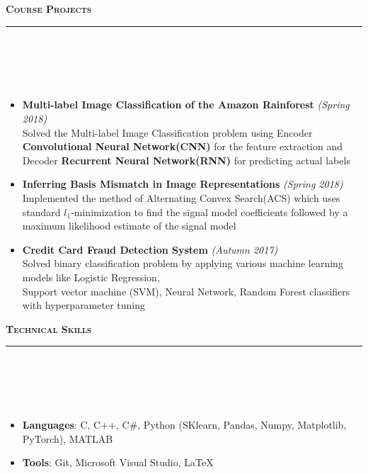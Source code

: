 \documentclass[a4paper,10pt]{article}
\newcommand{\lsep}{-0.5cm}
\newcommand{\resheading}[1]{{\small
        {
            \begin{minipage}
                {0.992\textwidth}\textbf{{\textsc{#1 \vphantom{p\^{E}} }}}
                \\[-0.3cm]
                \hrule
            \end{minipage}
            \\[-0.5cm]
        }
 }}
\begin{document}
\resheading{\textbf{\large Course Projects}}\\[\lsep]
\\[-0.35cm]
\begin{itemize}

\item \textbf{Multi-label Image Classification of the Amazon Rainforest}   \hfill {\emph{(Spring 2018)}}
\\
Solved the Multi-label Image Classification problem using Encoder \textbf{Convolutional Neural Network(CNN)} for the feature extraction and Decoder \textbf{Recurrent Neural Network(RNN)} for predicting actual labels
\\[-0.6cm]
\item \textbf{Inferring Basis Mismatch in Image Representations} \hfill {\emph{(Spring 2018)}}
\\
Implemented the method of Alternating Convex Search(ACS) which uses standard $l_1$-minimization to find the signal model coefficients followed by a maximum likelihood estimate of the signal model
\\[-0.6cm]
\item \textbf{Credit Card Fraud Detection System} \hfill {\emph{(Autumn 2017)}}
\\
Solved binary classification problem by applying various machine learning models like Logistic Regression, \\
Support vector machine (SVM), Neural Network, Random Forest classifiers with hyperparameter tuning
\\[-0.6cm] 
\end{itemize}
\resheading{\textbf{\large Technical Skills}}\\[\lsep] 
\\[-0.3cm]
\begin{itemize}
  \item \textbf{Languages}: C, C++,  C\#, Python (SKlearn, Pandas, Numpy, Matplotlib, PyTorch), MATLAB\\[-0.6cm]
  \item \textbf{Tools}: Git, Microsoft Visual Studio, \LaTeX \\[-0.6cm]
\end{itemize}
\end{document}
